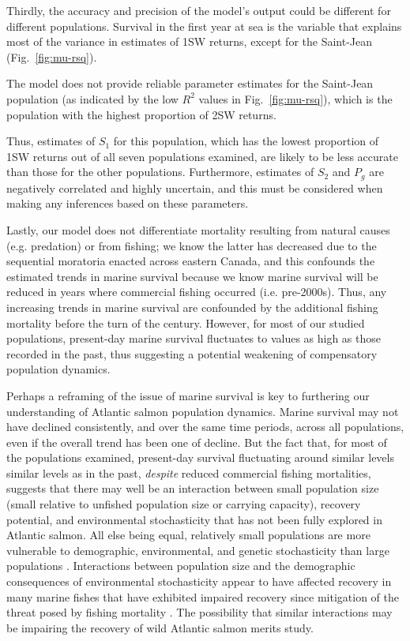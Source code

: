 \documentclass[12pt]{article}
\newcommand{\So}{$S_{1}$\xspace}
\newcommand{\St}{$S_{2}$\xspace}
\newcommand{\Pg}{$P_g$\xspace}
\begin{document}
Thirdly, the accuracy and precision of the model's output could be different
for different populations. Survival in the first
year at sea is the variable that explains most of the variance in estimates of 1SW returns, except for
the Saint-Jean (Fig.~\ref{fig:mu-rsq}). 

The model does not provide reliable parameter estimates for the Saint-Jean
population (as indicated by the low $R^2$ values in Fig.~\ref{fig:mu-rsq}),
which is the population with the highest proportion of 2SW returns.


Thus, estimates of \So for this
population, which has the lowest proportion of 1SW returns out of all seven
populations examined, are likely to be less accurate than those for the other
populations.
Furthermore, estimates of \St and \Pg are negatively correlated and highly uncertain,
and this must be considered when making any inferences based on these parameters.

Lastly, our model does not differentiate mortality resulting from natural
causes (e.g. predation) or from fishing; we know the latter has decreased
due to the sequential moratoria enacted across eastern Canada, and this
confounds the estimated trends in marine survival because we know marine survival
will be reduced in years where commercial fishing occurred (i.e. pre-2000s).
Thus, any increasing trends in marine survival are confounded by the additional 
fishing mortality before the turn of the century.
However, for most of our studied populations, 
present-day marine survival fluctuates to values
as high as those recorded in the past, thus
suggesting a potential weakening of compensatory population dynamics.

Perhaps a reframing of the issue of marine survival is key to furthering our
understanding of Atlantic salmon population dynamics. Marine survival may not
have declined consistently, and over the same time periods, across all
populations, even if the overall trend has been one of decline. 
But the fact that, for most of the populations examined, 
present-day survival fluctuating around similar levels  
similar levels as in the past, 
\emph{despite} reduced commercial fishing mortalities, suggests
that there may well be an interaction between small population size (small
relative to unfished population size or carrying capacity), recovery
potential, and environmental stochasticity that has not been fully explored in
Atlantic salmon. 
All else being equal, relatively small populations are more vulnerable to
demographic, environmental, and genetic stochasticity than large populations
\citep{Lande1993, Hutchings2015}. Interactions between population size and the
demographic consequences of environmental stochasticity appear to have
affected recovery in many marine fishes that have exhibited impaired recovery
since mitigation of the threat posed by fishing mortality
\citep{Hutchings2017, Hutchings2020}. The possibility that similar
interactions may be impairing the recovery of wild Atlantic salmon merits
study.
\end{document}
